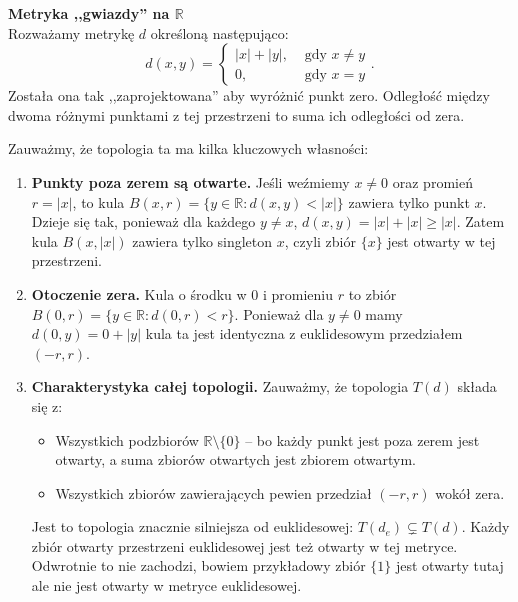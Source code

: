 \begin{eg}[1.1.7A]
	\noindent \textbf{Metryka ,,gwiazdy'' na $\mathbb{R}$} \\
	Rozważamy metrykę $d$ określoną następująco:
	\[
	d\left( x,y \right) = \begin{cases}
		\left| x \right| + \left| y \right|, &\text{ gdy } x \neq y \\
		0, &\text{ gdy } x = y
	\end{cases}
	.\] 
	Została ona tak ,,zaprojektowana'' aby wyróżnić punkt zero. Odległość między dwoma różnymi punktami z tej przestrzeni to suma ich odległości od zera.

	Zauważmy, że topologia ta ma kilka kluczowych własności:
	\begin{enumerate}[label=\arabic*)]
		\item \textbf{Punkty poza zerem są otwarte.} Jeśli weźmiemy $x\neq 0$ oraz promień $r = \left| x \right| $, to kula $B\left( x,r \right) = \{y \in \mathbb{R}: d\left( x,y \right) < \left| x \right| \} $ zawiera tylko punkt $x$. Dzieje się tak, ponieważ dla każdego $y\neq x$, $d\left( x,y \right) = \left| x \right| + \left| x \right| \ge \left| x \right| $. Zatem kula $B\left( x, \left| x \right|  \right) $ zawiera tylko singleton $x$, czyli zbiór $\{x\} $ jest otwarty w tej przestrzeni.
		\item \textbf{Otoczenie zera.} Kula o środku w $0$ i promieniu $r$ to zbiór $B\left( 0,r \right) = \{y \in \mathbb{R}: d\left( 0,r \right) < r \} $. Ponieważ dla $y \neq 0$ mamy $d\left( 0,y \right)  = 0 + \left| y \right| $ kula ta jest identyczna z euklidesowym przedziałem $\left( -r,r \right) $.
		\item \textbf{Charakterystyka całej topologii.} Zauważmy, że topologia $T\left( d \right) $ składa się z:
			\begin{itemize}
				\item Wszystkich podzbiorów $\mathbb{R}\setminus \{0\} $ -- bo każdy punkt jest poza zerem jest otwarty, a suma zbiorów otwartych jest zbiorem otwartym.
				\item Wszystkich zbiorów zawierających pewien przedział $\left( -r,r \right) $ wokół zera.
			\end{itemize}
		Jest to topologia znacznie silniejsza od euklidesowej: $T\left( d_{e} \right) \subsetneq T\left( d \right) $. Każdy zbiór otwarty przestrzeni euklidesowej jest też otwarty w tej metryce. Odwrotnie to nie zachodzi, bowiem przykładowy zbiór $\{1\} $ jest otwarty tutaj ale nie jest otwarty w metryce euklidesowej.
	\end{enumerate}
\end{eg} 

